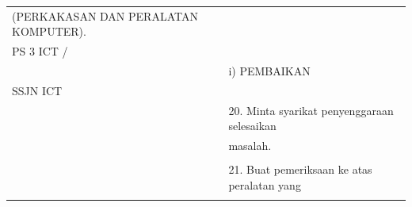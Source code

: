 \documentclass[
]{article}
\begin{document}
\begin{longtable}[]{@{}ll@{}}
\begin{minipage}[t]{0.71\columnwidth}
(PERKAKASAN DAN PERALATAN KOMPUTER).\strut
\end{minipage}\tabularnewline
\begin{minipage}[t]{0.23\columnwidth}\raggedright
PS 3 ICT /\strut
\end{minipage} & \begin{minipage}[t]{0.71\columnwidth}\raggedright
\strut
\end{minipage}\tabularnewline
\begin{minipage}[t]{0.23\columnwidth}\raggedright
\strut
\end{minipage} & \begin{minipage}[t]{0.71\columnwidth}\raggedright
i) PEMBAIKAN\strut
\end{minipage}\tabularnewline
\begin{minipage}[t]{0.23\columnwidth}\raggedright
SSJN ICT\strut
\end{minipage} & \begin{minipage}[t]{0.71\columnwidth}\raggedright
\strut
\end{minipage}\tabularnewline
\begin{minipage}[t]{0.23\columnwidth}\raggedright
\strut
\end{minipage} & \begin{minipage}[t]{0.71\columnwidth}\raggedright
20. Minta syarikat penyenggaraan selesaikan\strut
\end{minipage}\tabularnewline
\begin{minipage}[t]{0.23\columnwidth}\raggedright
\strut
\end{minipage} & \begin{minipage}[t]{0.71\columnwidth}\raggedright
masalah.\strut
\end{minipage}\tabularnewline
\begin{minipage}[t]{0.23\columnwidth}\raggedright
\strut
\end{minipage} & \begin{minipage}[t]{0.71\columnwidth}\raggedright
\strut
\end{minipage}\tabularnewline
\begin{minipage}[t]{0.23\columnwidth}\raggedright
\strut
\end{minipage} & \begin{minipage}[t]{0.71\columnwidth}\raggedright
21. Buat pemeriksaan ke atas peralatan yang\strut
\end{minipage}\tabularnewline
\begin{minipage}[t]{0.23\columnwidth}\raggedright
\strut
\end{minipage} & \begin{minipage}[t]{0.71\columnwidth}\raggedright

\end{minipage}
\end{longtable}
\end{document}

